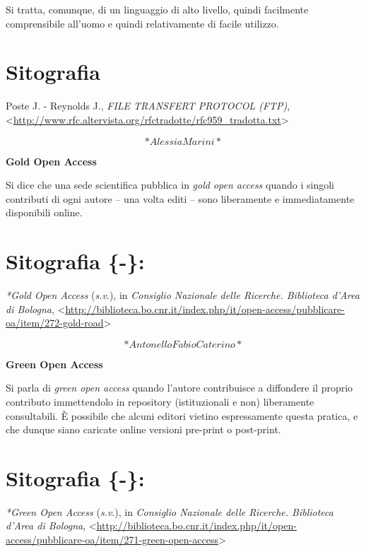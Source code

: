 \documentclass[
  b5paper,
  twoside,
  11pt,
  chapterprefix=false,
  bibliography=totocnumbered,
  listof=flat]{scrbook}
\begin{document}
Si tratta, comunque, di un linguaggio di alto livello, quindi facilmente
comprensibile all'uomo e quindi relativamente di facile utilizzo.

\hypertarget{sitografia-13}{%
\section*{Sitografia}\label{sitografia-13}}

Poste J. - Reynolds J., \emph{FILE TRANSFERT PROTOCOL (FTP)},
\textless{}\href{http://www.rfc.altervista.org/rfctradotte/rfc959_tradotta.txt}{{http://www.rfc.altervista.org/rfctradotte/rfc959\_tradotta.txt}}\textgreater{}

\[*Alessia Marini*\]

\textbf{Gold Open Access}

Si dice che una sede scientifica pubblica in \emph{gold open access} quando i
singoli contributi di ogni autore -- una volta editi -- sono liberamente
e immediatamente disponibili online.

\hypertarget{sitografia--}{%
\section{Sitografia \{-\}:}\label{sitografia--}}

\emph{*Gold Open Access} (\emph{s.v}.), in \emph{Consiglio Nazionale delle Ricerche.
Biblioteca d'Area di Bologna},
\textless{}{\url{http://biblioteca.bo.cnr.it/index.php/it/open-access/pubblicare-oa/item/272-gold-road}\textgreater{}}

\[*Antonello Fabio Caterino*\]

\textbf{Green Open Access}

Si parla di \emph{green open access} quando l'autore contribuisce a
diffondere il proprio contributo immettendolo in repository
(istituzionali e non) liberamente consultabili. È possibile che alcuni
editori vietino espressamente questa pratica, e che dunque siano
caricate online versioni pre-print o post-print.

\hypertarget{sitografia---1}{%
\section{Sitografia \{-\}:~}\label{sitografia---1}}

\emph{*Green Open Access} (\emph{s.v}.), in \emph{Consiglio Nazionale delle Ricerche.
Biblioteca d'Area di Bologna},
\textless{}{\url{http://biblioteca.bo.cnr.it/index.php/it/open-access/pubblicare-oa/item/271-green-open-access}\textgreater{}}
\end{document}
